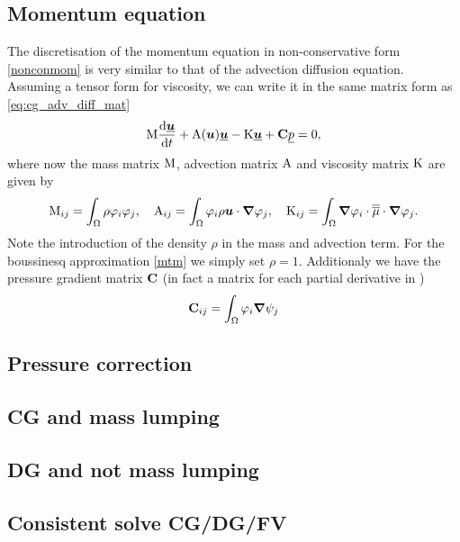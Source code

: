 \subsection{Momentum equation}
The discretisation of the momentum equation in non-conservative 
form \eqref{nonconmom} is very 
similar to that of the advection diffusion equation. Assuming a 
tensor form for viscosity, we can write it in the same matrix form as
\eqref{eq:cg_adv_diff_mat}
\begin{equation*}
  \mathrm{M} \frac{\mathrm{d}\underline{{\mbox{\boldmath$u$}}}}{\mathrm{d} t}
    +\mathrm{A}({\mbox{\boldmath$u$}})\underline{{\mbox{\boldmath$u$}}}-\mathrm{K}\underline{{\mbox{\boldmath$u$}}}
    +{\mbox{\boldmath$\mathrm{C}$}} \underline{p}
    =0,
\end{equation*}
where now the mass matrix $\mathrm{M}$, advection matrix $\mathrm{A}$ and
viscosity matrix $\mathrm{K}$ are given by
\begin{equation*}
  \mathrm{M}_{ij}=\int_\Omega \rho\varphi_i\varphi_j, \quad
  \mathrm{A}_{ij}=\int_\Omega \varphi_i\rho{\mbox{\boldmath$u$}}\cdot{\mbox{\boldmath$\nabla$}} \varphi_j, \quad
  \mathrm{K}_{ij}=\int_\Omega {\mbox{\boldmath$\nabla$}}\varphi_i\cdot \overline{\overline{\mu}}\cdot{\mbox{\boldmath$\nabla$}} \varphi_j.
\end{equation*}
Note the introduction of the density $\rho$ in the mass and advection 
term. For the boussinesq approximation \eqref{mtm} we simply set $\rho=1$.
Additionaly we have the pressure gradient matrix ${\mbox{\boldmath$\mathrm{C}$}}$
(in fact a matrix for each partial derivative in \vec\nabla)
\begin{equation*}
  {\mbox{\boldmath$\mathrm{C}$}}_{ij}=\int_\Omega \varphi_i{\mbox{\boldmath$\nabla$}}\psi_j
\end{equation*}

\subsection{Pressure correction}

\subsection{CG and mass lumping}


\subsection{DG and not mass lumping}

\subsection{Consistent solve CG/DG/FV}

